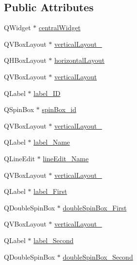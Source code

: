 \subsection*{Public Attributes}
\begin{DoxyCompactItemize}
\item 
Q\+Widget $\ast$ \hyperlink{class_ui___main_window_a30075506c2116c3ed4ff25e07ae75f81}{central\+Widget}
\item 
Q\+V\+Box\+Layout $\ast$ \hyperlink{class_ui___main_window_afb1464f1d82290bdb55ce9c30a62c2c5}{vertical\+Layout\+\_}
\item 
Q\+H\+Box\+Layout $\ast$ \hyperlink{class_ui___main_window_acd6fdc9ebacc4b25b834162380d75ce8}{horizontal\+Layout}
\item 
Q\+V\+Box\+Layout $\ast$ \hyperlink{class_ui___main_window_aecd96a04789fcfec3f98d80390ad8184}{vertical\+Layout}
\item 
Q\+Label $\ast$ \hyperlink{class_ui___main_window_a8f2f0b11f2f28973d92a1da7b3c1a2fa}{label\+\_\+\+I\+D}
\item 
Q\+Spin\+Box $\ast$ \hyperlink{class_ui___main_window_a99f69f054874249400f1fb09736ecc4a}{spin\+Box\+\_\+id}
\item 
Q\+V\+Box\+Layout $\ast$ \hyperlink{class_ui___main_window_a0c01bad60d9f422a1258e710635a2f65}{vertical\+Layout\+\_}
\item 
Q\+Label $\ast$ \hyperlink{class_ui___main_window_a8dc29c58515835c76b18f08e22eb02d5}{label\+\_\+\+Name}
\item 
Q\+Line\+Edit $\ast$ \hyperlink{class_ui___main_window_acf1a8c011a75bba0ffbae9c2e40a14f0}{line\+Edit\+\_\+\+Name}
\item 
Q\+V\+Box\+Layout $\ast$ \hyperlink{class_ui___main_window_a38b8a4b887f3b58e2a49e7905ae6f1f0}{vertical\+Layout\+\_}
\item 
Q\+Label $\ast$ \hyperlink{class_ui___main_window_a6fd163a42ddade5bc9b5bb3383cc7777}{label\+\_\+\+First}
\item 
Q\+Double\+Spin\+Box $\ast$ \hyperlink{class_ui___main_window_a56527845326b0a2ba6129adfc79b7777}{double\+Spin\+Box\+\_\+\+First}
\item 
Q\+V\+Box\+Layout $\ast$ \hyperlink{class_ui___main_window_a6f40fc110b15410c00837a446d57bdbe}{vertical\+Layout\+\_}
\item 
Q\+Label $\ast$ \hyperlink{class_ui___main_window_a3db38c95c92061c3f7205519da154cc5}{label\+\_\+\+Second}
\item 
Q\+Double\+Spin\+Box $\ast$ \hyperlink{class_ui___main_window_a17271f1a8cd9c3ca3b6d6ce10a280e2b}{double\+Spin\+Box\+\_\+\+Second}

\end{DoxyCompactItemize}

